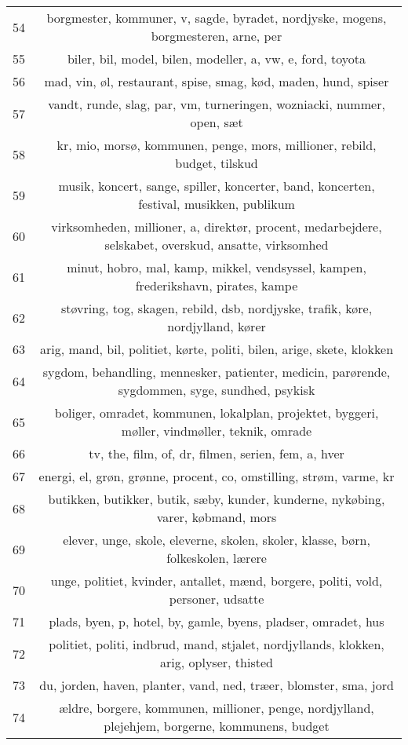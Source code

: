 \begin{longtable}[c]{c | c}
		54 & borgmester, kommuner, v, sagde, byradet, nordjyske, mogens, borgmesteren, arne, per \\
		55 & biler, bil, model, bilen, modeller, a, vw, e, ford, toyota \\
		56 & mad, vin, øl, restaurant, spise, smag, kød, maden, hund, spiser \\
		57 & vandt, runde, slag, par, vm, turneringen, wozniacki, nummer, open, sæt \\
		58 & kr, mio, morsø, kommunen, penge, mors, millioner, rebild, budget, tilskud \\
		59 & musik, koncert, sange, spiller, koncerter, band, koncerten, festival, musikken, publikum \\
		60 & virksomheden, millioner, a, direktør, procent, medarbejdere, selskabet, overskud, ansatte, virksomhed \\
		61 & minut, hobro, mal, kamp, mikkel, vendsyssel, kampen, frederikshavn, pirates, kampe \\
		62 & støvring, tog, skagen, rebild, dsb, nordjyske, trafik, køre, nordjylland, kører \\
		63 & arig, mand, bil, politiet, kørte, politi, bilen, arige, skete, klokken \\
		64 & sygdom, behandling, mennesker, patienter, medicin, parørende, sygdommen, syge, sundhed, psykisk \\
		65 & boliger, omradet, kommunen, lokalplan, projektet, byggeri, møller, vindmøller, teknik, omrade \\
		66 & tv, the, film, of, dr, filmen, serien, fem, a, hver \\
		67 & energi, el, grøn, grønne, procent, co, omstilling, strøm, varme, kr \\
		68 & butikken, butikker, butik, sæby, kunder, kunderne, nykøbing, varer, købmand, mors \\
		69 & elever, unge, skole, eleverne, skolen, skoler, klasse, børn, folkeskolen, lærere \\
		70 & unge, politiet, kvinder, antallet, mænd, borgere, politi, vold, personer, udsatte \\
		71 & plads, byen, p, hotel, by, gamle, byens, pladser, omradet, hus \\
		72 & politiet, politi, indbrud, mand, stjalet, nordjyllands, klokken, arig, oplyser, thisted \\
		73 & du, jorden, haven, planter, vand, ned, træer, blomster, sma, jord \\
		74 & ældre, borgere, kommunen, millioner, penge, nordjylland, plejehjem, borgerne, kommunens, budget \\

\end{longtable}
